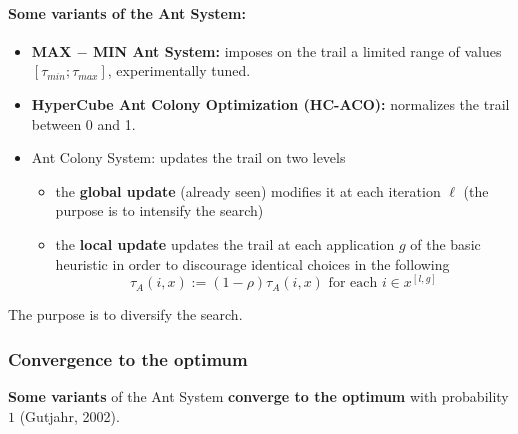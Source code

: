 \newpage

\paragraph{Some variants of the Ant System:}
\begin{itemize}
	\item \textbf{MAX $-$ MIN Ant System:} imposes on the trail a limited range of values $[\tau_{min}; \tau_{max}]$, experimentally tuned.\\
	
	\item \textbf{HyperCube Ant Colony Optimization (HC-ACO):} normalizes the trail between 0 and 1.\\
	
	\item Ant Colony System: updates the trail on two levels
	\begin{itemize}
		\item the \textbf{global update} (already seen) modifies it at each iteration $\ell$ (the purpose is to intensify the search)
		
		\item the \textbf{local update} updates the trail at each application $g$ of the basic heuristic in order to discourage identical choices in the following
		$$ \tau_A (i, x) := (1 - \rho) \tau_A (i, x) \text{ for each } i \in x^{[l,g]}$$
	\end{itemize}
	\nn
\end{itemize}
The purpose is to diversify the search.\\

\newpage

\subsubsection{Convergence to the optimum}
\textbf{Some variants} of the Ant System \textbf{converge to the optimum} with probability $1$ (Gutjahr, 2002).\\

